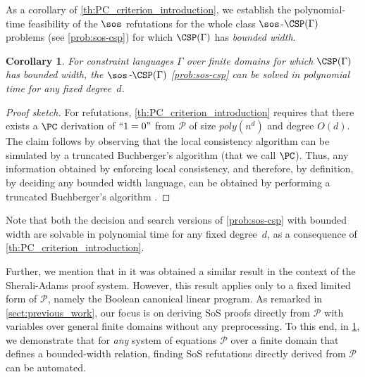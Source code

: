 \documentclass[11pt]{article}
\newtheorem{corollary}[theorem]{Corollary}
\begin{document}
As a corollary of \cref{th:PC_criterion_introduction}, we establish the polynomial-time feasibility of the $\sos$ refutations for the whole class $\sos$-$\CSP(\Gamma)$ problems (see \cref{prob:sos-csp}) for which $\CSP(\Gamma)$ has \emph{bounded width}. %
\begin{corollary}\label{th:BW}
    For constraint languages $\Gamma$ over finite domains for which $\CSP(\Gamma)$ has \emph{bounded width}, the $\sos$-$\CSP(\Gamma)$ \cref{prob:sos-csp} can be solved in polynomial time for any fixed degree~$d$.
\end{corollary}
\begin{proof}[Proof sketch]
    For refutations, \cref{th:PC_criterion_introduction} requires that there exists a $\PC$ derivation of $``1 = 0"$ from $\mathcal{P}$ of size $poly(n^d)$ and degree $O(d)$.
    The claim follows by observing that the local consistency algorithm can be simulated by a truncated Buchberger's algorithm (that we call $\PC$). Thus, any information obtained by enforcing local consistency{, and therefore, by definition, by deciding any bounded width language,} can be obtained by performing a truncated Buchberger's algorithm \cite{JeffersonJGD13,Bulatov23}.
\end{proof}

Note that both the decision and search versions of \cref{prob:sos-csp} with bounded width are solvable in polynomial time for any fixed degree~$d$, as a consequence of \cref{th:PC_criterion_introduction}.

Further, we mention that in \cite{ThapperZ18} it was obtained a similar result in the context of the Sherali-Adams proof system. However, this result applies only to a fixed limited form of $\mathcal{P}$, namely the Boolean canonical linear program. As remarked in \cref{sect:previous_work}, our focus is on deriving SoS proofs directly from $\mathcal{P}$ with variables over general finite domains without any preprocessing. To this end, in \cref{th:BW}, we demonstrate that for \emph{any} system of equations $\mathcal{P}$ over a finite domain that defines a bounded-width relation, finding SoS refutations directly derived from $\mathcal{P}$ can be automated.

\end{document}
